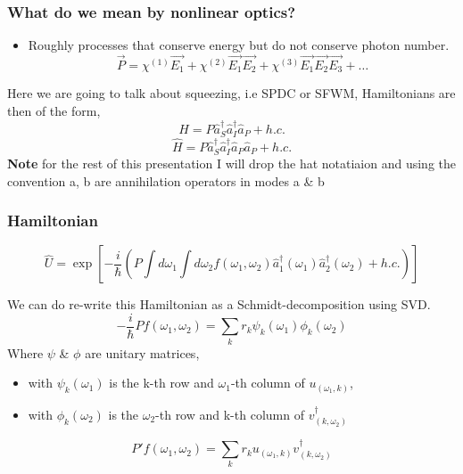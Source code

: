 \documentclass{beamer}
\renewcommand{\annia}{\hat{a}}
\renewcommand{\creata}{\hat{a}^\dagger}
\begin{document}
\begin{frame}
\frametitle{What do we mean by nonlinear optics?}
\begin{itemize} 
    \item Roughly processes that conserve energy but do not conserve photon number. 
        \begin{equation}
            \vec{P}= \chi^{(1)} \vec{E_1} + \chi^{(2)}\vec{E_1}\vec{E_2} + \chi^{(3)}\vec{E_1}\vec{E_2}\vec{E_3} + \dots
        \end{equation}
\end{itemize}
Here we are going to talk about squeezing, i.e SPDC or SFWM, Hamiltonians are then of the form, 
\begin{equation} 
    \hat{H} = P \creata_S \creata_I \annia_P + h.c.
\end{equation}
\begin{equation} 
    \hat{H} = P \creata_S \creata_I \annia_P \annia_P + h.c.
\end{equation}
\textbf{Note} for the rest of this presentation I will drop the hat notatiaion and using the convention a, b are annihilation operators in modes a \& b
\end{frame}

\begin{frame}
    \frametitle{Hamiltonian}
    
    \begin{equation}
        \hat{U} = \exp[-\frac{i}{\hbar}\left( P \int d\omega_1 \int d\omega_2 f(\omega_1,\omega_2) \creata_1(\omega_1) \creata_2(\omega_2) + h.c. \right) ]
    \end{equation}
\end{frame}
\begin{frame}
    We can do re-write this Hamiltonian as a Schmidt-decomposition using SVD.
    \begin{equation}
    -\frac{i}{\hbar}P f(\omega_1,\omega_2) = \sum_k r_k \psi_k(\omega_1) \phi_k(\omega_2)
    \end{equation}
    Where $ \psi $ \& $\phi $ are unitary matrices,
    \begin{itemize}
        \item with $ \psi_k(\omega_1) $ is the k-th row and $\omega_1$-th column of $u_{(\omega_1, k)}$,
        \item with $ \phi_k(\omega_2) $ is the $\omega_2$-th row and k-th column of $v^\dagger_{(k,\omega_2)}$
    \end{itemize}
    \begin{equation}
        P' f(\omega_1, \omega_2) = \sum_k r_k u_{(\omega_1, k)} v_{(k, \omega_2)}^\dagger
    \end{equation}
\end{frame}
\end{document}
